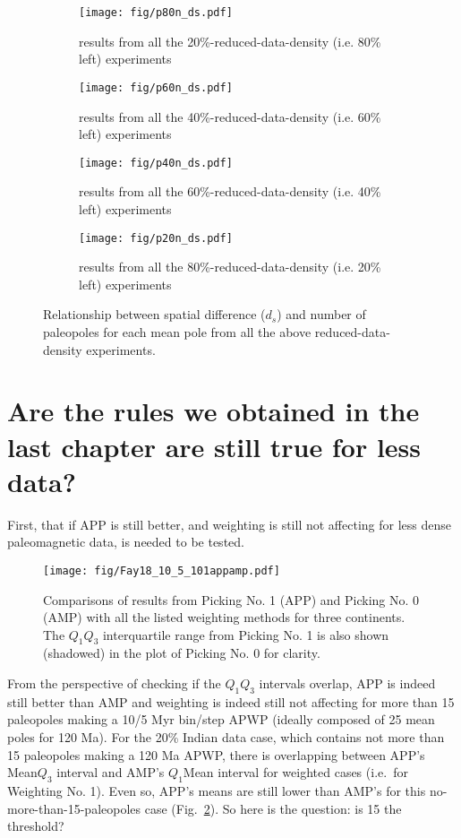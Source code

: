 \begin{figure}
	\centering
	\begin{subfigure}{.49\textwidth}
		\texttt{[image: fig/p80n\_ds.pdf]}
		\caption{results from all the 20\%-reduced-data-density (i.e. 80\% left)
		experiments}
	\end{subfigure}
	\begin{subfigure}{.49\textwidth}
		\texttt{[image: fig/p60n\_ds.pdf]}
		\caption{results from all the 40\%-reduced-data-density (i.e. 60\% left)
		experiments}
	\end{subfigure}
	\begin{subfigure}{.49\textwidth}
		\texttt{[image: fig/p40n\_ds.pdf]}
		\caption{results from all the 60\%-reduced-data-density (i.e. 40\% left)
		experiments}
	\end{subfigure}
	\begin{subfigure}{.49\textwidth}
		\texttt{[image: fig/p20n\_ds.pdf]}
		\caption{results from all the 80\%-reduced-data-density (i.e. 20\% left)
		experiments}
	\end{subfigure}
	\caption[ ]{Relationship between spatial difference ($d_s$) and number of
	paleopoles for each mean pole from all the above reduced-data-density
	experiments.}\label{fig-n_ds2}
\end{figure}

\section{Are the rules we obtained in the last chapter are still true for less
data?}

First, that if APP is still better, and weighting is still not affecting for
less dense paleomagnetic data, is needed to be tested.

\begin{figure}
    \centering
        \texttt{[image: fig/Fay18\_10\_5\_101appamp.pdf]}
    \captionsetup{width=1\textwidth}
    \caption{Comparisons of results from Picking No. 1 (APP) and Picking No. 0
	(AMP) with all the listed weighting methods for three continents. The
	$Q_1$\textendash$Q_3$ interquartile range from Picking No. 1 is also shown
	(shadowed) in the plot of Picking No. 0 for clarity.}\label{Fig:Fay18_10_5_101appamp}
\end{figure}

From the perspective of checking if the $Q_1$\textendash$Q_3$ intervals overlap,
APP is indeed still better than AMP and weighting is indeed still not affecting
for more than 15 paleopoles making a 10/5 Myr bin/step APWP (ideally composed of
25 mean poles for 120 Ma). For the 20\% Indian data case, which
contains not more than 15 paleopoles making a 120 Ma APWP, there is
overlapping between APP's Mean\textendash$Q_3$ interval and AMP's
$Q_1$\textendash{}Mean interval for weighted cases (i.e.\ for Weighting No.
1). Even so, APP's means are still lower than AMP's for this
no-more-than-15-paleopoles case (Fig.~\ref{Fig:Fay18_10_5_101appamp}). So here
is the question: is 15 the threshold?
